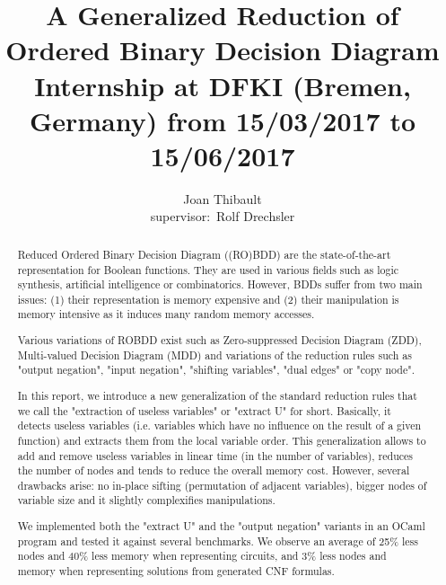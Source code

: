 \documentclass[a4paper,10pt]{article}
\title{A Generalized Reduction of Ordered Binary Decision Diagram\\{\small Internship at DFKI (Bremen, Germany) from 15/03/2017 to 15/06/2017}}
\author{Joan Thibault\\supervisor:~Rolf Drechsler}
\begin{document}
\maketitle
\begin{abstract}
Reduced Ordered Binary Decision Diagram ((RO)BDD)\cite{Bryant1986, Somenzi1999} are the state-of-the-art representation for Boolean functions.
They are used in various fields such as logic synthesis, artificial intelligence or combinatorics.
However, BDDs suffer from two main issues: (1) their representation is memory expensive and (2) their manipulation is memory intensive as it induces many random memory accesses.


Various variations of ROBDD exist such as Zero-suppressed Decision Diagram (ZDD)\cite{IntroZDD}, Multi-valued Decision Diagram (MDD)\cite{IntroMDD, IntroMddRolf} and variations of the reduction rules such as "output negation"\cite{BryantVariantN}, "input negation"\cite{MinatoVariants}, "shifting variables"\cite{MinatoVariants}, "dual edges"\cite{RolfVariantDual} or "copy node"\cite{RolfVariantCopy}.


In this report, we introduce a new generalization of the standard reduction rules that we call the "extraction of useless variables" or "extract U" for short.
Basically, it detects useless variables (i.e. variables which have no influence on the result of a given function) and extracts them from the local variable order.
This generalization allows to add and remove useless variables in linear time (in the number of variables), reduces the number of nodes and tends to reduce the overall memory cost.
However, several drawbacks arise: no in-place sifting (permutation of adjacent variables), bigger nodes of variable size and it slightly complexifies manipulations.


We implemented both the "extract U" and the "output negation" variants in an OCaml program and tested it against several benchmarks\cite{BenchSatlib, BenchLgsynth91, BenchIscas99}.
We observe an average of 25\% less nodes and 40\% less memory when representing circuits, and 3\% less nodes and memory when representing solutions from generated CNF formulas.
\end{abstract}

\newpage

\newcommand{\shannon}[3]{#1 \longrightarrow_S #2, #3}
\newcommand{\N}{\mathbb{N}}%
\newcommand{\B}{\mathbb{B}}
\newcommand{\F}{\mathbb{F}}
\newcommand{\Y}{\mathbb{Y}}
\newcommand{\I}{\mathbb{I}}
\newcommand{\Ynode}{\Y\mathtt{-node}}
\newcommand{\Ynodes}{\Y\mathtt{-nodes}}
\newcommand{\T}{\mathbb{T}}
\end{document}
